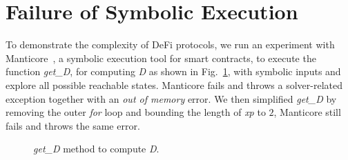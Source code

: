 \section{Failure of Symbolic Execution}
To demonstrate the complexity of DeFi protocols, we run an experiment with
Manticore~\cite{mossberg2019manticore}, a symbolic execution tool for smart
contracts, to execute the function \emph{get\_D}, for computing \emph{D} as
shown in Fig.~\ref{fig:new_get_D}, with symbolic inputs and explore all
possible reachable states. Manticore fails and throws a solver-related
exception together with an \emph{out of memory} error. We then simplified
\emph{get\_D} by removing the outer \emph{for} loop and bounding the length of
\emph{xp} to $2$, Manticore still fails and throws the same error. 



\begin{figure}[t]
    \centering
    \begin{minipage}[h]{0.9\linewidth}
    
    \end{minipage}
    \vspace{-3mm}
    \caption{\emph{get\_D} method to compute \emph{D}.}
 \vspace{-5mm}
\label{fig:new_get_D}
\end{figure}



